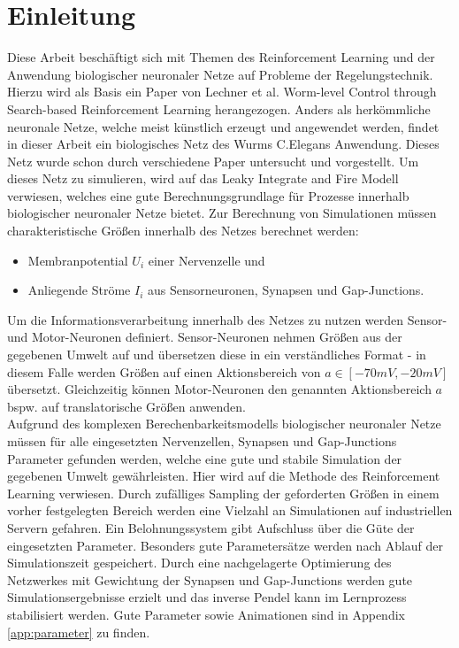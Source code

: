 %
\chapter{Einleitung}
\label{chap:einleitung}
%

	Diese Arbeit beschäftigt sich mit Themen des Reinforcement Learning und der Anwendung biologischer neuronaler Netze auf Probleme der Regelungstechnik.\\
	Hierzu wird als Basis ein Paper von Lechner et al. \glqq Worm-level Control through Search-based Reinforcement Learning \grqq{} \cite{WormLevelRL} herangezogen. Anders als herkömmliche neuronale Netze, welche meist künstlich erzeugt und angewendet werden, findet in dieser Arbeit ein biologisches Netz des Wurms C.Elegans Anwendung. Dieses Netz wurde schon durch verschiedene Paper \cite{CElegans} \cite{SimCE} \cite{Wicks1996} untersucht und vorgestellt. Um dieses Netz zu simulieren, wird auf das Leaky Integrate and Fire Modell verwiesen, welches eine gute Berechnungsgrundlage für Prozesse innerhalb biologischer neuronaler Netze bietet. Zur Berechnung von Simulationen müssen charakteristische Größen innerhalb des Netzes berechnet werden:
	\begin{itemize}
		\item Membranpotential $U_i$ einer Nervenzelle und
		\item Anliegende Ströme $I_i$ aus Sensorneuronen, Synapsen und Gap-Junctions.
	\end{itemize}
	Um die Informationsverarbeitung innerhalb des Netzes zu nutzen werden Sensor- und Motor-Neuronen definiert. Sensor-Neuronen nehmen Größen aus der gegebenen Umwelt auf und übersetzen diese in ein verständliches Format - in diesem Falle werden Größen auf einen Aktionsbereich von $a \in [-70mV, -20mV]$ übersetzt. Gleichzeitig können Motor-Neuronen den genannten Aktionsbereich $a$ bspw. auf translatorische Größen anwenden.\\
	Aufgrund des komplexen Berechenbarkeitsmodells biologischer neuronaler Netze müssen für alle eingesetzten Nervenzellen, Synapsen und Gap-Junctions Parameter gefunden werden, welche eine gute und stabile Simulation der gegebenen Umwelt gewährleisten. Hier wird auf die Methode des Reinforcement Learning verwiesen. Durch zufälliges Sampling der geforderten Größen in einem vorher festgelegten Bereich werden eine Vielzahl an Simulationen auf industriellen Servern gefahren. Ein Belohnungssystem gibt Aufschluss über die Güte der eingesetzten Parameter. Besonders gute Parametersätze werden nach Ablauf der Simulationszeit gespeichert. Durch eine nachgelagerte Optimierung des Netzwerkes mit Gewichtung der Synapsen und Gap-Junctions werden gute Simulationsergebnisse erzielt und das inverse Pendel kann im Lernprozess stabilisiert werden. Gute Parameter sowie Animationen sind in Appendix \ref{app:parameter} zu finden.


